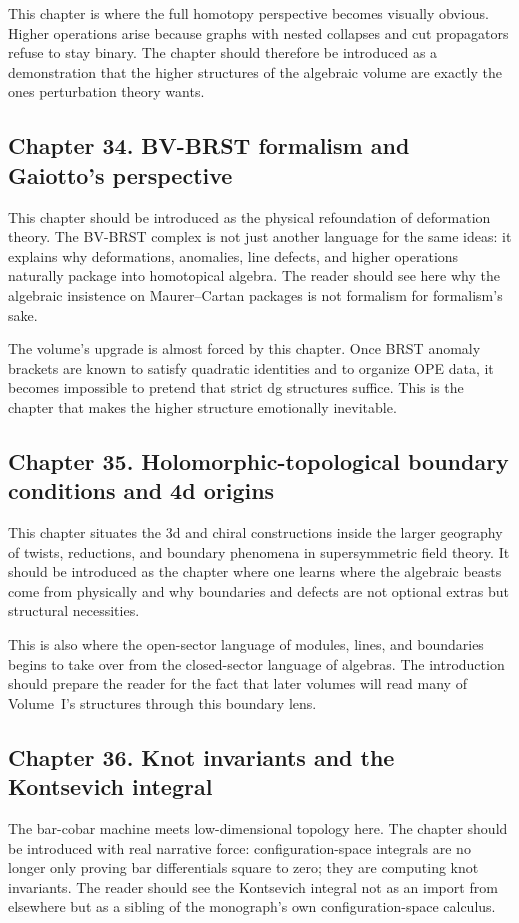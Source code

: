 This chapter is where the full homotopy perspective becomes visually obvious.  Higher operations arise because graphs with nested collapses and cut propagators refuse to stay binary.  The chapter should therefore be introduced as a demonstration that the higher structures of the algebraic volume are exactly the ones perturbation theory wants.

\subsection*{Chapter 34. BV-BRST formalism and Gaiotto's perspective}
This chapter should be introduced as the physical refoundation of deformation theory.  The BV-BRST complex is not just another language for the same ideas: it explains why deformations, anomalies, line defects, and higher operations naturally package into homotopical algebra.  The reader should see here why the algebraic insistence on Maurer--Cartan packages is not formalism for formalism's sake.

The volume's upgrade is almost forced by this chapter.  Once BRST anomaly brackets are known to satisfy quadratic identities and to organize OPE data, it becomes impossible to pretend that strict dg structures suffice.  This is the chapter that makes the higher structure emotionally inevitable.

\subsection*{Chapter 35. Holomorphic-topological boundary conditions and 4d origins}
This chapter situates the 3d and chiral constructions inside the larger geography of twists, reductions, and boundary phenomena in supersymmetric field theory.  It should be introduced as the chapter where one learns where the algebraic beasts come from physically and why boundaries and defects are not optional extras but structural necessities.

This is also where the open-sector language of modules, lines, and boundaries begins to take over from the closed-sector language of algebras.  The introduction should prepare the reader for the fact that later volumes will read many of Volume~I's structures through this boundary lens.

\subsection*{Chapter 36. Knot invariants and the Kontsevich integral}
The bar-cobar machine meets low-dimensional topology here.  The chapter should be introduced with real narrative force: configuration-space integrals are no longer only proving bar differentials square to zero; they are computing knot invariants.  The reader should see the Kontsevich integral not as an import from elsewhere but as a sibling of the monograph's own configuration-space calculus.

